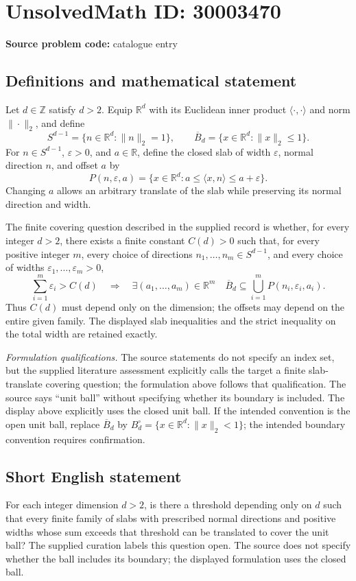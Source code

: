 \documentclass[11pt]{article}
\newcommand{\Z}{\mathbb{Z}}
\newcommand{\R}{\mathbb{R}}
\begin{document}
\section*{UnsolvedMath ID: 30003470}
\textbf{Source problem code:} catalogue entry
\subsection{Definitions and mathematical statement}
Let \(d\in\Z\) satisfy \(d>2\). Equip \(\R^d\) with its Euclidean inner product \(\langle\cdot,\cdot\rangle\) and norm \(\|\cdot\|_2\), and define
\[
S^{d-1}=\{n\in\R^d:\|n\|_2=1\},\qquad
\overline B_d=\{x\in\R^d:\|x\|_2\leq1\}.
\]
For \(n\in S^{d-1}\), \(\varepsilon>0\), and \(a\in\R\), define the closed slab of width \(\varepsilon\), normal direction \(n\), and offset \(a\) by
\[
P(n,\varepsilon,a)=\{x\in\R^d:a\leq\langle x,n\rangle\leq a+\varepsilon\}.
\]
Changing \(a\) allows an arbitrary translate of the slab while preserving its normal direction and width.

The finite covering question described in the supplied record is whether, for every integer \(d>2\), there exists a finite constant \(C(d)>0\) such that, for every positive integer \(m\), every choice of directions \(n_1,\ldots,n_m\in S^{d-1}\), and every choice of widths \(\varepsilon_1,\ldots,\varepsilon_m>0\),
\[
\sum_{i=1}^{m}\varepsilon_i>C(d)
\quad\Longrightarrow\quad
\exists(a_1,\ldots,a_m)\in\R^m\quad
\overline B_d\subseteq\bigcup_{i=1}^{m}P(n_i,\varepsilon_i,a_i).
\]
Thus \(C(d)\) must depend only on the dimension; the offsets may depend on the entire given family. The displayed slab inequalities and the strict inequality on the total width are retained exactly.

\emph{Formulation qualifications.} The source statements do not specify an index set, but the supplied literature assessment explicitly calls the target a finite slab-translate covering question; the formulation above follows that qualification. The source says ``unit ball'' without specifying whether its boundary is included. The display above explicitly uses the closed unit ball. If the intended convention is the open unit ball, replace \(\overline B_d\) by \(B_d^{\circ}=\{x\in\R^d:\|x\|_2<1\}\); the intended boundary convention requires confirmation.
\subsection{Short English statement}
For each integer dimension \(d>2\), is there a threshold depending only on \(d\) such that every finite family of slabs with prescribed normal directions and positive widths whose sum exceeds that threshold can be translated to cover the unit ball? The supplied curation labels this question open. The source does not specify whether the ball includes its boundary; the displayed formulation uses the closed ball.
\end{document}
